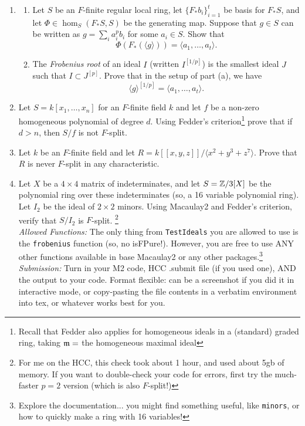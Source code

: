 \documentclass[11pt]{amsart}
\begin{document}
\begin{enumerate}[itemsep=3em]
\begin{enumerate}
\end{enumerate}

\item  \begin{enumerate}

\item Let $S$ be an $F$-finite regular local ring, let $\{F_*b_i\}_{i=1}^t$ be basis for $F_*S$, and let $\Phi\in \hom_S(F_*S,S)$ be the generating map. Suppose that $g\in S$ can be written as $g=\sum_i a_i^pb_i$ for some $a_i\in S$. Show that
\[
\Phi(F_*(\langle g\rangle)) = \langle a_1,\ldots, a_t\rangle.
\]



\item The \emph{Frobenius root} of an ideal $I$ (written $I^{[1/p]}$) is the smallest ideal $J$ such that $I\subset J^{[p]}$. Prove that in the setup of part (a), we have
\[
\langle g\rangle ^{[1/p]} = \langle a_1,\ldots, a_t\rangle.
\]


\end{enumerate}

\item Let $S=k[x_1,\ldots, x_n]$ for an $F$-finite field $k$ and let $f$ be a non-zero homogeneous polynomial of degree $d$. Using Fedder's criterion\footnote{Recall that Fedder also applies for homogeneous ideals in a (standard) graded ring, taking $\mathfrak{m} =$ the homogeneous maximal ideal} prove that if $d>n$, then $S/f$ is not $F$-split.




\item Let $k$ be an $F$-finite  field and let $R=k[[x,y,z]]/\langle x^2+y^3+z^7\rangle$. Prove that $R$ is never $F$-split in any characteristic.


\item Let $X$ be a $4\times 4$ matrix of indeterminates, and let $S=\mathbb{Z}/3[X]$ be the polynomial ring over these indeterminates (so, a 16 variable polynomial ring). Let $I_2$ be the ideal of $2\times 2$ minors. Using Macaulay2 and Fedder's criterion, verify that $S/I_2$ is $F$-split. \footnote{For me on the HCC, this check took about 1 hour, and used about 5gb of memory. If you want to double-check your code for errors, first try the much-faster $p=2$ version (which is also $F$-split!)}\vspace{1ex}\\
\emph{Allowed Functions:} The only thing from \verb|TestIdeals| you are allowed to use is the \verb|frobenius| function (so, no isFPure!). However, you are free to use ANY other functions available in base Macaulay2 or any other packages.\footnote{Explore the documentation... you might find something useful, like \texttt{minors}, or how to quickly make a ring with 16 variables!} \vspace{1ex} \\
\emph{Submission:} Turn in your M2 code, HCC .submit file (if you used one), AND the output to your code. Format flexible: can be a screenshot if you did it in interactive mode, or copy-pasting the file contents in a verbatim environment into tex, or whatever works best for you.


\end{enumerate}
\end{document}
